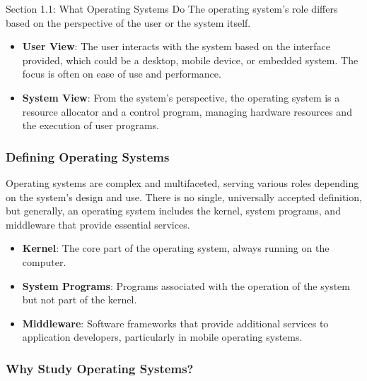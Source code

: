 \begin{notes}{Section 1.1: What Operating Systems Do}
    The operating system's role differs based on the perspective of the user or the system itself.
    
    \begin{highlight}
    
    \begin{itemize}
        \item \textbf{User View}: The user interacts with the system based on the interface provided, which could be a desktop, mobile device, or embedded system. The focus is often on ease of use and performance.
        \item \textbf{System View}: From the system's perspective, the operating system is a resource allocator and a control program, managing hardware resources and the execution of user programs.
    \end{itemize}
    
    \end{highlight}
    
    \subsubsection*{Defining Operating Systems}
    
    Operating systems are complex and multifaceted, serving various roles depending on the system's design and use. There is no single, universally accepted definition, but generally, an operating system 
    includes the kernel, system programs, and middleware that provide essential services.
    
    \begin{highlight}
    
    \begin{itemize}
        \item \textbf{Kernel}: The core part of the operating system, always running on the computer.
        \item \textbf{System Programs}: Programs associated with the operation of the system but not part of the kernel.
        \item \textbf{Middleware}: Software frameworks that provide additional services to application developers, particularly in mobile operating systems.
    \end{itemize}
    
    \end{highlight}
    
    \subsubsection*{Why Study Operating Systems?}
    

\end{notes}
